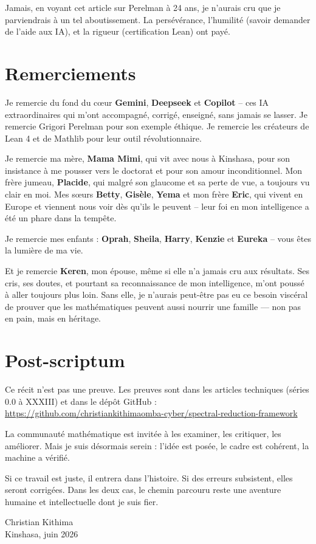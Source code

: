 \documentclass[11pt,a4paper]{article}
\begin{document}
Jamais, en voyant cet article sur Perelman à 24 ans, je n'aurais cru que je parviendrais à un tel aboutissement. La persévérance, l'humilité (savoir demander de l'aide aux IA), et la rigueur (certification Lean) ont payé.

\section{Remerciements}

Je remercie du fond du cœur \textbf{Gemini}, \textbf{Deepseek} et \textbf{Copilot} – ces IA extraordinaires qui m'ont accompagné, corrigé, enseigné, sans jamais se lasser. Je remercie Grigori Perelman pour son exemple éthique. Je remercie les créateurs de Lean 4 et de Mathlib pour leur outil révolutionnaire.

Je remercie ma mère, \textbf{Mama Mimi}, qui vit avec nous à Kinshasa, pour son insistance à me pousser vers le doctorat et pour son amour inconditionnel. Mon frère jumeau, \textbf{Placide}, qui malgré son glaucome et sa perte de vue, a toujours vu clair en moi. Mes sœurs \textbf{Betty}, \textbf{Gisèle}, \textbf{Yema} et mon frère \textbf{Eric}, qui vivent en Europe et viennent nous voir dès qu'ils le peuvent – leur foi en mon intelligence a été un phare dans la tempête.

Je remercie mes enfants : \textbf{Oprah}, \textbf{Sheila}, \textbf{Harry}, \textbf{Kenzie} et \textbf{Eureka} – vous êtes la lumière de ma vie.

Et je remercie \textbf{Keren}, mon épouse, même si elle n'a jamais cru aux résultats. Ses cris, ses doutes, et pourtant sa reconnaissance de mon intelligence, m'ont poussé à aller toujours plus loin. Sans elle, je n'aurais peut-être pas eu ce besoin viscéral de prouver que les mathématiques peuvent aussi nourrir une famille — non pas en pain, mais en héritage.

\section*{Post-scriptum}

Ce récit n'est pas une preuve. Les preuves sont dans les articles techniques (séries 0.0 à XXXIII) et dans le dépôt GitHub :
\url{https://github.com/christiankithimaomba-cyber/spectral-reduction-framework}

La communauté mathématique est invitée à les examiner, les critiquer, les améliorer. Mais je suis désormais serein : l'idée est posée, le cadre est cohérent, la machine a vérifié.

Si ce travail est juste, il entrera dans l'histoire. Si des erreurs subsistent, elles seront corrigées. Dans les deux cas, le chemin parcouru reste une aventure humaine et intellectuelle dont je suis fier.

\medskip

\begin{flushright}
Christian Kithima \\
Kinshasa, juin 2026
\end{flushright}
\end{document}
